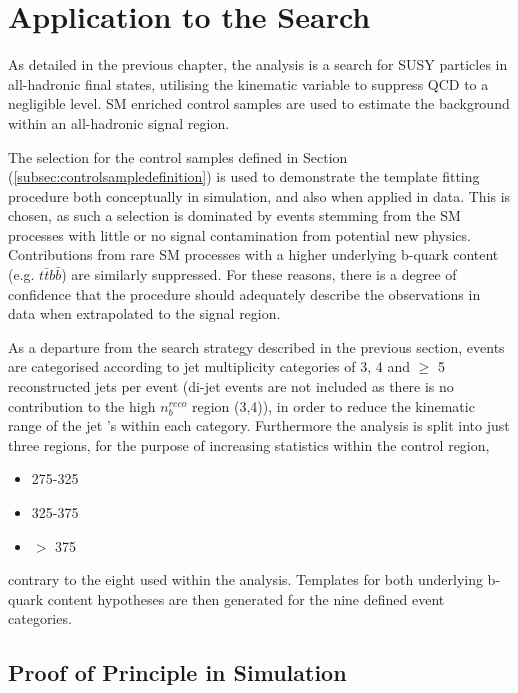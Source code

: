 \FloatBarrier
\section{ Application to the \alphat Search}
\label{sec:templateapplication}

As detailed in the previous chapter, the \alphat analysis is a search for \ac{SUSY} particles in all-hadronic final states, utilising the kinematic variable \alphat to suppress QCD to a negligible level. \ac{SM} enriched control samples are used to estimate the background within an all-hadronic signal region. 

The selection for the \mupjets control samples defined in Section (\ref{subsec:controlsampledefinition}) is used to demonstrate the template fitting procedure both conceptually in simulation, and also when applied in data. This is chosen, as such a selection is dominated by events stemming from the \ac{SM} processes with little or no signal contamination from potential new physics. Contributions from rare \ac{SM} processes with a higher underlying b-quark content (e.g. $t\bar{t}b\bar{b}$) are similarly suppressed. For these reasons, there is a degree of confidence that the procedure should adequately describe the observations in data when extrapolated to the signal region.

As a departure from the \alphat search strategy described in the previous section, events are categorised according to jet multiplicity categories of 3, 4 and $\geq$ 5 reconstructed jets per event (di-jet events are not included as there is no contribution to the high $n_{b}^{reco}$ region (3,4)), in order to reduce the kinematic range of the jet \pt's within each category. Furthermore the analysis is split into just three \theht regions, for the purpose of increasing statistics within the control region, 

\begin{itemize}
\item 275-325 \GeV
\item 325-375 \GeV
\item $>$ 375 \GeV
\end{itemize}

contrary to the eight used within the \alphat analysis. Templates for both underlying b-quark content hypotheses are then generated for the nine defined event categories.

\subsection{Proof of Principle in Simulation}
\label{subsec:templateclosuretest}

